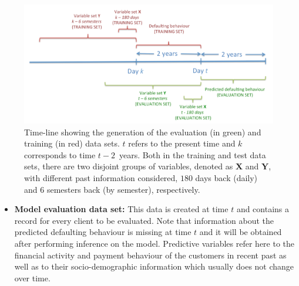 \documentclass{article}
\theoremstyle{theorem}
\theoremstyle{definition}
\newcommand{\X}{\mathbf{X}}
\newcommand{\Y}{\mathbf{Y}}
\begin{document}
{%

\begin{figure}[ht!]
\centering
\includegraphics[scale=0.35]{figures/CajamarTimeLine}
\caption{\label{Figure:CajaMarTimeLine}Time-line showing the generation of the evaluation (in green) and training (in red) data sets. $t$ refers to the present time and $k$ corresponds to time $t-2$\ years. Both in the training and test data sets, there are two disjoint groups of variables, denoted as $\X$ and $\Y$, with different past information considered, $180$ days back (daily) and $6$ semesters back (by semester), respectively.}

\end{figure}

\begin{itemize}

\item \textbf{Model evaluation data set:} This data is created at time $t$ and contains a record for every client to be evaluated. Note that information about the predicted defaulting behaviour is missing at time $t$ and it will be obtained after performing inference on the model. Predictive variables refer here to the financial activity and payment behaviour of the customers in recent past as well as to their socio-demographic information which usually does not change over time. 


\end{itemize}}
\end{document}
